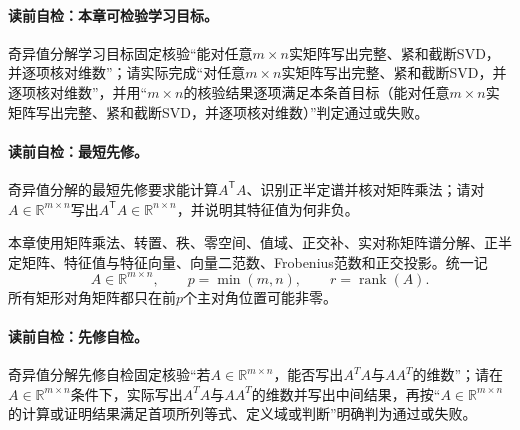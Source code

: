 \label{struct:V4-C03-CH01}
\paragraph{读前自检：本章可检验学习目标。}奇异值分解学习目标固定核验“能对任意$m\times n$实矩阵写出完整、紧和截断SVD，并逐项核对维数”；请实际完成“对任意$m\times n$实矩阵写出完整、紧和截断SVD，并逐项核对维数”，并用“$m\times n$的核验结果逐项满足本条首目标（能对任意$m\times n$实矩阵写出完整、紧和截断SVD，并逐项核对维数）”判定通过或失败。\par


\label{struct:V4-C03-CH02}
\paragraph{读前自检：最短先修。}奇异值分解的最短先修要求能计算$A^{\mathsf T}A$、识别正半定谱并核对矩阵乘法；请对$A\in\mathbb R^{m\times n}$写出$A^{\mathsf T}A\in\mathbb R^{n\times n}$，并说明其特征值为何非负。\par

\begin{prerequisitebox}
本章使用矩阵乘法、转置、秩、零空间、值域、正交补、实对称矩阵谱分解、正半定矩阵、特征值与特征向量、向量二范数、Frobenius范数和正交投影。统一记
\[
A\in\mathbb R^{m\times n},\qquad p=\min(m,n),\qquad r=\operatorname{rank}(A).
\]
所有矩形对角矩阵都只在前$p$个主对角位置可能非零。
\end{prerequisitebox}

\label{struct:V4-C03-CH03}
\paragraph{读前自检：先修自检。}奇异值分解先修自检固定核验“若$A\in\mathbb R^{m\times n}$，能否写出$A^TA$与$AA^T$的维数”；请在$A\in\mathbb R^{m\times n}$条件下，实际写出$A^TA$与$AA^T$的维数并写出中间结果，再按“$A\in\mathbb R^{m\times n}$的计算或证明结果满足首项所列等式、定义域或判断”明确判为通过或失败。\par


